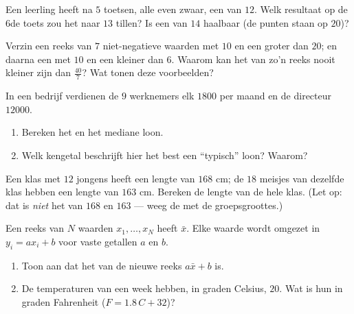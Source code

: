 \begin{exercise}[$\star\star$]\label{exo:g10:stats:5}
Een leerling heeft na $5$ toetsen, alle even zwaar, een  van $12$.
Welk resultaat op de $6$de toets zou het  naar $13$ tillen? Is een
 van $14$ haalbaar (de punten staan op $20$)?
\end{exercise}

\begin{exercise}[$\star\star$]\label{exo:g10:stats:6}
Verzin een reeks van $7$ niet-negatieve waarden met  $10$ en een
 groter dan $20$; en daarna een met  $10$ en een 
kleiner dan $6$. Waarom kan het  van zo'n reeks nooit kleiner zijn
dan $\frac{40}{7}$? Wat tonen deze voorbeelden?
\end{exercise}

\begin{exercise}[$\star\star$]\label{exo:g10:stats:7}
In een bedrijf verdienen de $9$ werknemers elk $1800$ per maand en de
directeur $12000$.
\begin{enumerate}
  \item Bereken het  en het mediane loon.
  \item Welk kengetal beschrijft hier het best een ``typisch'' loon? Waarom?
\end{enumerate}
\end{exercise}

\begin{exercise}[$\star\star$]\label{exo:g10:stats:8}
Een klas met $12$ jongens heeft een  lengte van $168$ cm; de $18$
meisjes van dezelfde klas hebben een  lengte van $163$ cm. Bereken
de  lengte van de hele klas. (Let op: dat is \emph{niet} het 
van $168$ en $163$ --- weeg de  met de groepsgroottes.)
\end{exercise}

\begin{exercise}[$\star\star\star$]\label{exo:g10:stats:9}
Een reeks van $N$ waarden $x_1, \dots, x_N$ heeft  $\bar x$. Elke
waarde wordt omgezet in $y_i = a x_i + b$ voor vaste getallen $a$ en $b$.
\begin{enumerate}
  \item Toon aan dat het  van de nieuwe reeks $a \bar x + b$ is.
  \item De temperaturen van een week hebben, in graden Celsius, 
        $20$. Wat is hun  in graden Fahrenheit ($F = 1.8\,C + 32$)?
\end{enumerate}
\end{exercise}

